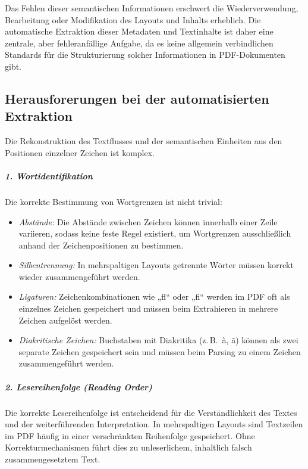Das Fehlen dieser semantischen Informationen erschwert die Wiederverwendung, Bearbeitung oder Modifikation des Layouts und Inhalts erheblich. \cite{Corrêa2017}
Die automatische Extraktion dieser Metadaten und Textinhalte ist daher eine zentrale, aber fehleranfällige Aufgabe, da es keine 
allgemein verbindlichen Standards für die Strukturierung solcher Informationen in PDF-Dokumenten gibt. \cite{Lipinski2013}





\subsection{Herausforerungen bei der automatisierten Extraktion}

Die Rekonstruktion des Textflusses und der semantischen Einheiten aus den Positionen einzelner Zeichen ist komplex.

\subparagraph{1. Wortidentifikation}
Die korrekte Bestimmung von Wortgrenzen ist nicht trivial:
\begin{itemize}
    \item \emph{Abstände:} Die Abstände zwischen Zeichen können innerhalb einer Zeile variieren, sodass keine feste Regel existiert, 
    um Wortgrenzen ausschließlich anhand der Zeichenpositionen zu bestimmen. \cite{Bast2017}
    \item \emph{Silbentrennung:} In mehrspaltigen Layouts getrennte Wörter müssen korrekt wieder zusammengeführt werden. \cite{Bast2017}
    \item \emph{Ligaturen:} Zeichenkombinationen wie „fl“ oder „fi“ werden im PDF oft als einzelnes Zeichen gespeichert und 
    müssen beim Extrahieren in mehrere Zeichen aufgelöst werden. \cite{Lipinski2013}
    \item \emph{Diakritische Zeichen:} Buchstaben mit Diakritika (z.\,B.\ à, ã) können als zwei separate Zeichen gespeichert sein
    und müssen beim Parsing zu einem Zeichen zusammengeführt werden. \cite{Bast2017}
\end{itemize}

\subparagraph{2. Lesereihenfolge (Reading Order)}
Die korrekte Lesereihenfolge ist entscheidend für die Verständlichkeit des Textes und der weiterführenden Interpretation.  \cite{Bast2017}
In mehrspaltigen Layouts sind Textzeilen im PDF häufig in einer verschränkten Reihenfolge gespeichert. 
Ohne Korrekturmechanismen führt dies zu unleserlichem, inhaltlich falsch zusammengesetztem Text.\cite{Lovegrove1995}


